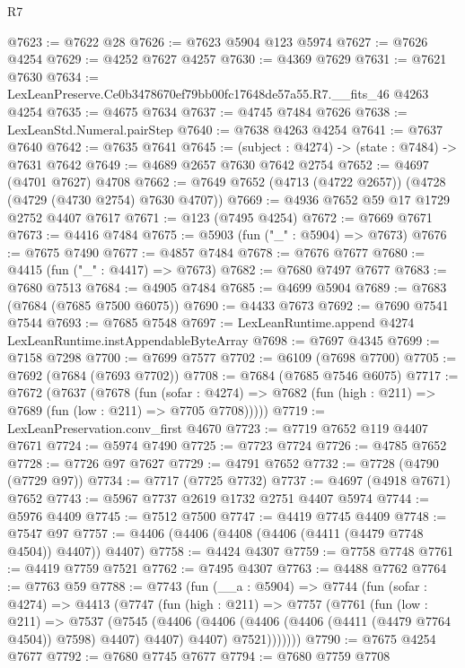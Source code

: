 \begin{lexlean}{R7}
\begin{coremodule}
@7623 := @7622 @28
@7626 := @7623 @5904 @123 @5974
@7627 := @7626 @4254
@7629 := @4252 @7627 @4257
@7630 := @4369 @7629
@7631 := @7621 @7630
@7634 := LexLeanPreserve.Ce0b3478670ef79bb00fc17648de57a55.R7.__fits_46 @4263 @4254
@7635 := @4675 @7634
@7637 := @4745 @7484 @7626
@7638 := LexLeanStd.Numeral.pairStep
@7640 := @7638 @4263 @4254
@7641 := @7637 @7640
@7642 := @7635 @7641
@7645 := (subject : @4274) -> (state : @7484) -> @7631 @7642
@7649 := @4689 @2657 @7630 @7642 @2754
@7652 := @4697 (@4701 @7627) @4708
@7662 := @7649 @7652 (@4713 (@4722 @2657)) (@4728 (@4729 (@4730 @2754) @7630 @4707))
@7669 := @4936 @7652 @59 @17 @1729 @2752 @4407 @7617
@7671 := @123 (@7495 @4254)
@7672 := @7669 @7671
@7673 := @4416 @7484
@7675 := @5903 (fun ("_" : @5904) => @7673)
@7676 := @7675 @7490
@7677 := @4857 @7484
@7678 := @7676 @7677
@7680 := @4415 (fun ("_" : @4417) => @7673)
@7682 := @7680 @7497 @7677
@7683 := @7680 @7513
@7684 := @4905 @7484
@7685 := @4699 @5904
@7689 := @7683 (@7684 (@7685 @7500 @6075))
@7690 := @4433 @7673
@7692 := @7690 @7541 @7544
@7693 := @7685 @7548
@7697 := LexLeanRuntime.append @4274 LexLeanRuntime.instAppendableByteArray
@7698 := @7697 @4345
@7699 := @7158 @7298
@7700 := @7699 @7577
@7702 := @6109 (@7698 @7700)
@7705 := @7692 (@7684 (@7693 @7702))
@7708 := @7684 (@7685 @7546 @6075)
@7717 := @7672
    (@7637
      (@7678
        (fun (sofar : @4274) =>
        @7682 (fun (high : @211) => @7689 (fun (low : @211) => @7705 @7708)))))
@7719 := LexLeanPreservation.conv_first @4670
@7723 := @7719 @7652 @119 @4407 @7671
@7724 := @5974 @7490
@7725 := @7723 @7724
@7726 := @4785 @7652
@7728 := @7726 @97 @7627
@7729 := @4791 @7652
@7732 := @7728 (@4790 (@7729 @97))
@7734 := @7717 (@7725 @7732)
@7737 := @4697 (@4918 @7671) @7652
@7743 := @5967 @7737 @2619 @1732 @2751 @4407 @5974
@7744 := @5976 @4409
@7745 := @7512 @7500
@7747 := @4419 @7745 @4409
@7748 := @7547 @97
@7757 := @4406 (@4406 (@4408 (@4406 (@4411 (@4479 @7748 @4504)) @4407)) @4407)
@7758 := @4424 @4307
@7759 := @7758 @7748
@7761 := @4419 @7759 @7521
@7762 := @7495 @4307
@7763 := @4488 @7762
@7764 := @7763 @59
@7788 := @7743
    (fun (__a : @5904) =>
    @7744
      (fun (sofar : @4274) =>
      @4413
        (@7747
          (fun (high : @211) =>
          @7757
            (@7761
              (fun (low : @211) =>
              @7537
                (@7545
                  (@4406
                    (@4406 (@4406 (@4406 (@4411 (@4479 @7764 @4504)) @7598) @4407) @4407)
                    @4407)
                  @7521)))))))
@7790 := @7675 @4254 @7677
@7792 := @7680 @7745 @7677
@7794 := @7680 @7759 @7708

\end{coremodule}
\end{lexlean}
